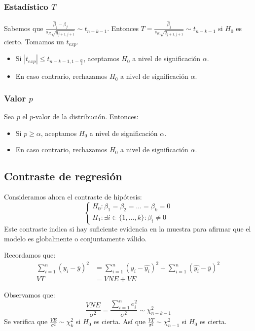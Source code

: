 \subsubsection*{Estadístico $T$}
Sabemos que $\frac{\hat{\beta}_j - \beta_j}{s_R \sqrt{q_{j+1, j+1}}} \sim t_{n-k-1}$.
Entonces $T = \frac{\hat{\beta}_j}{s_R \sqrt{q_{j+1, j+1}}} \sim t_{n-k-1}$ si $H_0$ es cierto.
Tomamos un $t_{exp}$.
\begin{itemize}
    \item Si $|t_{exp}| \leq t_{n-k-1, 1-\frac{\alpha}{2}}$, aceptamos $H_0$ a nivel de significación $\alpha$.
    \item En caso contrario, rechazamos $H_0$ a nivel de significación $\alpha$.
\end{itemize}

\subsubsection*{Valor $p$}
Sea $p$ el $p$-valor de la distribución. Entonces:
\begin{itemize}
    \item Si $p \geq \alpha$, aceptamos $H_0$ a nivel de significación $\alpha$.
    \item En caso contrario, rechazamos $H_0$ a nivel de significación $\alpha$.
\end{itemize}

\subsection*{Contraste de regresión}
Consideramos ahora el contraste de hipótesis:
$$\begin{cases}
        H_0: \beta_1 = \beta_2 = \dots = \beta_k = 0 \\
        H_1: \exists i \in \{1, \dots, k\} : \beta_i \neq 0
    \end{cases}$$
Este contraste indica si hay suficiente evidencia en la muestra para afirmar que el modelo es globalmente o conjuntamente válido.

Recordamos que:
\begin{align*}
    \sum_{i=1}^n (y_i - \bar{y})^2 & = \sum_{i=1}^n (y_i - \hat{y_i})^2 + \sum_{i=1}^n (\hat{y_i} - \bar{y})^2 \\
    VT                             & = VNE + VE
\end{align*}

Observamos que:
$$\frac{VNE}{\sigma^2} = \frac{\sum_{i=1}^n e_i^2}{\sigma^2} \sim \chi^2_{n-k-1}$$
Se verifica que $\frac{VE}{\sigma^2} \sim \chi^2_k$ si $H_0$ es cierta.
Así que $\frac{VT}{\sigma^2} \sim \chi^2_{n-1}$ si $H_0$ es cierta.

